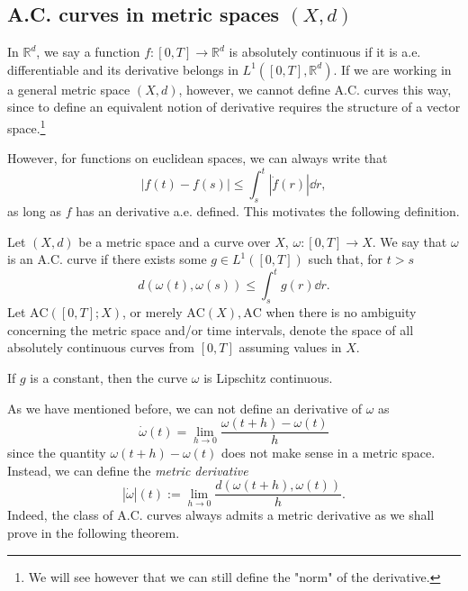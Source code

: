 \subsection{A.C. curves in metric spaces $(X,d)$} 
In $\mathbb{R}^d$, we say a function $f:[0,T] \to \mathbb{R}^d$ is absolutely continuous if it is a.e. differentiable and its derivative belongs in $L^1\left([0,T], \mathbb{R}^d\right)$. If we are working in a general metric space $(X,d)$, however, we cannot define A.C. curves this way, since to define an equivalent notion of derivative requires the structure of a vector space.\footnote{We will see however that we can still define the "norm" of the derivative.}

However, for functions on euclidean spaces, we can always write that 
\begin{equation*}
|f(t) - f(s)| \le \int_s^t |\dot{f}(r)|\dd r,
\end{equation*} 
as long as $f$ has an derivative a.e. defined. This motivates the following definition. 

\begin{definition}
	Let $(X,d)$ be a metric space and a curve over $X$, $\omega : [0,T] \to X$. We say that $\omega$ is an A.C. curve if there exists some $g \in L^1([0,T])$ such that, for $t > s$
	\begin{equation*}
	d\left(\omega(t), \omega(s)\right) \le \int_s^t g(r)\dd r.
	\end{equation*}
	Let $\text{AC}([0,T];X)$, or merely $\text{AC}(X), \text{AC}$ when there is no ambiguity concerning the metric space and/or time intervals, denote the space of all absolutely continuous curves from $[0,T]$ assuming values in $X$.  
\end{definition}
\begin{remark}
	If $g$ is a constant, then the curve $\omega$ is Lipschitz continuous. 
\end{remark}

As we have mentioned before, we can not define an derivative of $\omega$ as 
\begin{equation}
\dot{\omega}(t) = \lim_{h \to 0} \frac{\omega(t+h) - \omega(t)}{h}
\end{equation}
since the quantity $\omega(t+h) - \omega(t)$ does not make sense in a metric space. Instead, we can define the {\em metric derivative}
\begin{equation}
\label{metric_derivative}
|\dot{\omega}|(t) := \lim_{h \to 0} \frac{d(\omega(t+h), \omega(t))}{h}.
\end{equation}
Indeed, the class of A.C. curves always admits a metric derivative as we shall prove in the following theorem. 

